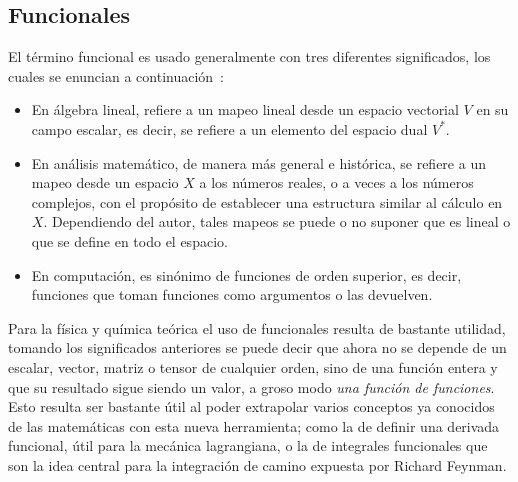 \subsection{Funcionales}

El término funcional es usado generalmente con tres diferentes significados, los cuales
se enuncian a continuación~\cite{1990}:
%
\begin{itemize}
\item En álgebra lineal, refiere a un mapeo lineal desde un espacio vectorial
$V$ en su campo escalar, es decir, se refiere a un elemento del espacio dual
$V^{*}$.
\item En análisis matemático, de manera más general e histórica, se refiere a
un mapeo desde un espacio $X$ a los números reales, o a veces a los números
complejos, con el propósito de establecer una estructura similar al cálculo en
$X$. Dependiendo del autor, tales mapeos se puede o no suponer que es lineal o
que se define en todo el espacio.
\item En computación, es sinónimo de funciones de orden superior, es decir,
funciones que toman funciones como argumentos o las devuelven.
\end{itemize}

Para la física y química teórica el uso de funcionales resulta de bastante
utilidad, tomando los significados anteriores se puede decir que ahora no se
depende de un escalar, vector, matriz o tensor de cualquier orden, sino de una
función entera y que su resultado sigue siendo un valor, a groso modo
\textit{una función de funciones}. Esto resulta ser bastante útil al poder
extrapolar varios conceptos ya conocidos de las matemáticas con esta nueva
herramienta; como la de definir una derivada funcional, útil para la mecánica
lagrangiana, o la de integrales funcionales que son la idea central para la
integración de camino expuesta por Richard Feynman.

